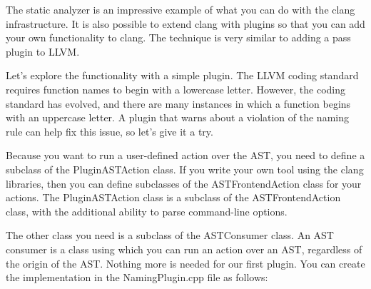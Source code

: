 
The static analyzer is an impressive example of what you can do with the clang infrastructure. It is also possible to extend clang with plugins so that you can add your own functionality to clang. The technique is very similar to adding a pass plugin to LLVM.

Let’s explore the functionality with a simple plugin. The LLVM coding standard requires function names to begin with a lowercase letter. However, the coding standard has evolved, and there are many instances in which a function begins with an uppercase letter. A plugin that warns about a violation of the naming rule can help fix this issue, so let’s give it a try.

Because you want to run a user-defined action over the AST, you need to define a subclass of the PluginASTAction class. If you write your own tool using the clang libraries, then you can define subclasses of the ASTFrontendAction class for your actions. The PluginASTAction class is a subclass of the ASTFrontendAction class, with the additional ability to parse command-line options.

The other class you need is a subclass of the ASTConsumer class. An AST consumer is a class using which you can run an action over an AST, regardless of the origin of the AST. Nothing more is needed for our first plugin. You can create the implementation in the NamingPlugin.cpp file as follows:

